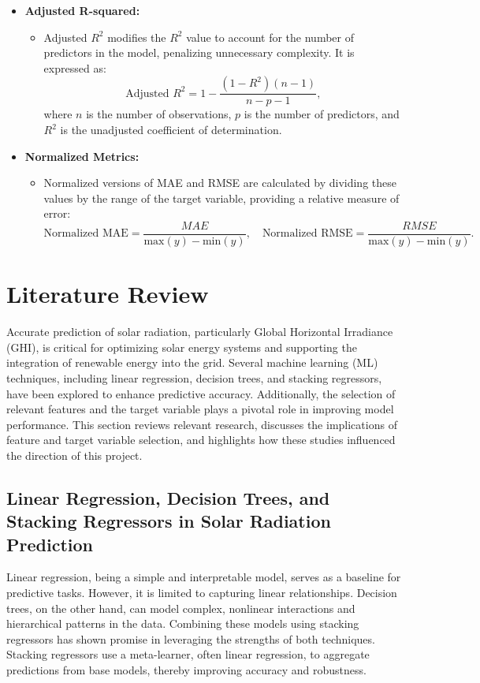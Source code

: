 \documentclass[10pt,twocolumn]{article}
\begin{document}
\begin{itemize}
\begin{itemize}
    \item \textbf{Adjusted R-squared:}
    \begin{itemize}
        \item  Adjusted \( R^2 \) modifies the \( R^2 \) value to account for the number of predictors in the model, penalizing unnecessary complexity.\cite{20} It is expressed as:
        \[
        \text{Adjusted } R^2 = 1 - \frac{(1 - R^2)(n - 1)}{n - p - 1},
        \]
        where \( n \) is the number of observations, \( p \) is the number of predictors, and \( R^2 \) is the unadjusted coefficient of determination.
    \end{itemize}

    \item \textbf{Normalized Metrics:}
    \begin{itemize}
        \item  Normalized versions of MAE and RMSE are calculated by dividing these values by the range of the target variable, providing a relative measure of error\cite{20}:
        \[
        \text{Normalized MAE} = \frac{MAE}{\text{max}(y) - \text{min}(y)}, \quad \text{Normalized RMSE} = \frac{RMSE}{\text{max}(y) - \text{min}(y)}.
        \]
    \end{itemize}
\end{itemize}


\section{Literature Review}

Accurate prediction of solar radiation, particularly Global Horizontal Irradiance (GHI), is critical for optimizing solar energy systems and supporting the integration of renewable energy into the grid. Several machine learning (ML) techniques, including linear regression, decision trees, and stacking regressors, have been explored to enhance predictive accuracy. Additionally, the selection of relevant features and the target variable plays a pivotal role in improving model performance. This section reviews relevant research, discusses the implications of feature and target variable selection, and highlights how these studies influenced the direction of this project.

\subsection{Linear Regression, Decision Trees, and Stacking Regressors in Solar Radiation Prediction}
Linear regression, being a simple and interpretable model, serves as a baseline for predictive tasks. However, it is limited to capturing linear relationships. Decision trees, on the other hand, can model complex, nonlinear interactions and hierarchical patterns in the data. Combining these models using stacking regressors has shown promise in leveraging the strengths of both techniques. Stacking regressors use a meta-learner, often linear regression, to aggregate predictions from base models, thereby improving accuracy and robustness.


\end{itemize}
\end{document}
